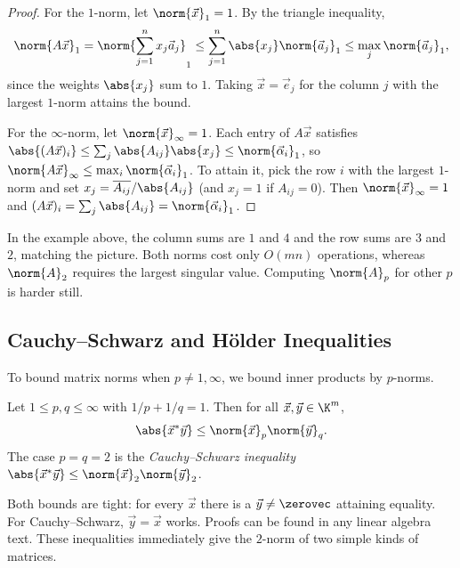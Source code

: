\begin{proof}
  For the $1$-norm, let $\norm{\vec{x}}_1 = 1$. By the triangle inequality,
  \begin{equation}
    \norm{A\vec{x}}_1 = \norm{\sum_{j=1}^{n}x_j\vec{a}_j}_1 \le \sum_{j=1}^{n}\abs{x_j}\norm{\vec{a}_j}_1 \le \max_j\norm{\vec{a}_j}_1,
  \end{equation}
  since the weights $\abs{x_j}$ sum to $1$. Taking $\vec{x} = \vec{e}_j$ for the column $j$ with the largest $1$-norm attains the bound.

  For the $\infty$-norm, let $\norm{\vec{x}}_\infty = 1$. Each entry of $A\vec{x}$ satisfies $\abs{(A\vec{x})_i} \le \sum_j\abs{A_{ij}}\abs{x_j} \le \norm{\vec{\alpha}_i}_1$, so $\norm{A\vec{x}}_\infty \le \max_i\norm{\vec{\alpha}_i}_1$. To attain it, pick the row $i$ with the largest $1$-norm and set $x_j = \overline{A_{ij}}/\abs{A_{ij}}$ (and $x_j = 1$ if $A_{ij} = 0$). Then $\norm{\vec{x}}_\infty = 1$ and $(A\vec{x})_i = \sum_j\abs{A_{ij}} = \norm{\vec{\alpha}_i}_1$.
\end{proof}

In the example above, the column sums are $1$ and $4$ and the row sums are $3$ and $2$, matching the picture. Both norms cost only $O(mn)$ operations, whereas $\norm{A}_2$ requires the largest singular value. Computing $\norm{A}_p$ for other $p$ is harder still.

\subsection{Cauchy--Schwarz and H\"older Inequalities}

To bound matrix norms when $p \ne 1, \infty$, we bound inner products by $p$-norms.

\begin{theorem}
  \label{thm:holder}
  Let $1 \le p, q \le \infty$ with $1/p + 1/q = 1$. Then for all $\vec{x}, \vec{y} \in \K^m$,
  \begin{equation}
    \abs{\vec{x}^\ast\vec{y}} \le \norm{\vec{x}}_p\norm{\vec{y}}_q.
  \end{equation}
  The case $p = q = 2$ is the \emph{Cauchy--Schwarz inequality} $\abs{\vec{x}^\ast\vec{y}} \le \norm{\vec{x}}_2\norm{\vec{y}}_2$.
\end{theorem}

Both bounds are tight: for every $\vec{x}$ there is a $\vec{y} \ne \zerovec$ attaining equality. For Cauchy--Schwarz, $\vec{y} = \vec{x}$ works. Proofs can be found in any linear algebra text. These inequalities immediately give the $2$-norm of two simple kinds of matrices.

